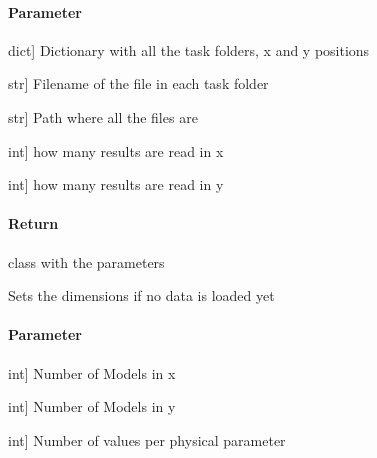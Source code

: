 \documentclass[letterpaper,10pt,english]{sphinxmanual}
\begin{document}
\begin{fulllineitems}
\begin{fulllineitems}
\paragraph{Parameter}
\label{\detokenize{classes:id19}}\begin{description}
\sphinxlineitem{task}{[}dict{]}
\sphinxAtStartPar
Dictionary with all the task folders, x and y positions

\sphinxlineitem{filename}{[}str{]}
\sphinxAtStartPar
Filename of the file in each task folder

\sphinxlineitem{path}{[}str{]}
\sphinxAtStartPar
Path where all the files are

\sphinxlineitem{nx}{[}int{]}
\sphinxAtStartPar
how many results are read in x

\sphinxlineitem{ny}{[}int{]}
\sphinxAtStartPar
how many results are read in y

\end{description}


\paragraph{Return}
\label{\detokenize{classes:id20}}
\sphinxAtStartPar
class with the parameters

\end{fulllineitems}


\begin{fulllineitems}
\label{\detokenize{classes:id21}}
\pysigstartsignatures
{}
\pysigstopsignatures
\sphinxAtStartPar
Sets the dimensions if no data is loaded yet


\paragraph{Parameter}
\label{\detokenize{classes:id22}}\begin{description}
\sphinxlineitem{nx}{[}int{]}
\sphinxAtStartPar
Number of Models in x

\sphinxlineitem{ny}{[}int{]}
\sphinxAtStartPar
Number of Models in y

\sphinxlineitem{npars}{[}int{]}
\sphinxAtStartPar
Number of values per physical parameter


\end{description}
\end{fulllineitems}
\end{fulllineitems}
\end{document}
